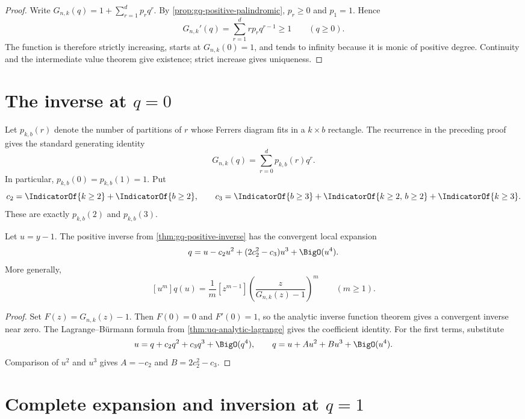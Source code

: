\begin{proof}
Write \(G_{n,k}(q)=1+\sum_{r=1}^{d}p_rq^r\).  By
\cref{prop:gq-positive-palindromic}, \(p_r\ge0\) and \(p_1=1\).  Hence
\[
  G_{n,k}'(q)=\sum_{r=1}^{d}rp_rq^{r-1}\ge1
  \qquad(q\ge0).
\]
The function is therefore strictly increasing, starts at \(G_{n,k}(0)=1\),
and tends to infinity because it is monic of positive degree.  Continuity and
the intermediate value theorem give existence; strict increase gives
uniqueness.
\end{proof}

\section{\texorpdfstring{The inverse at \(q=0\)}{The inverse at q=0}}
\label{sec:gaussian-zero}

Let \(p_{k,b}(r)\) denote the number of partitions of \(r\) whose Ferrers
diagram fits in a \(k\times b\) rectangle.  The recurrence in the preceding
proof gives the standard generating identity
\[
  G_{n,k}(q)=\sum_{r=0}^{d}p_{k,b}(r)q^r.
\]
In particular, \(p_{k,b}(0)=p_{k,b}(1)=1\).  Put
\[
  c_2=\IndicatorOf{k\ge2}+\IndicatorOf{b\ge2},
  \qquad
  c_3=\IndicatorOf{b\ge3}
      +\IndicatorOf{k\ge2,\,b\ge2}
      +\IndicatorOf{k\ge3}.
\]
These are exactly \(p_{k,b}(2)\) and \(p_{k,b}(3)\).

\begin{theorem}
\label{thm:gq-zero-inverse}
Let \(u=y-1\).  The positive inverse from
\cref{thm:gq-positive-inverse} has the convergent local expansion
\[
  q=u-c_2u^2+(2c_2^2-c_3)u^3+\BigO(u^4).
\]
More generally,
\[
  [u^m]q(u)
  =\frac1m[z^{m-1}]
    \left(\frac{z}{G_{n,k}(z)-1}\right)^m
  \qquad(m\ge1).
\]
\end{theorem}

\begin{proof}
Set \(F(z)=G_{n,k}(z)-1\).  Then \(F(0)=0\) and \(F'(0)=1\), so the
analytic inverse function theorem gives a convergent inverse near zero.
The Lagrange--Bürmann formula from
\cref{thm:uq-analytic-lagrange} gives the coefficient identity.  For the
first terms, substitute
\[
  u=q+c_2q^2+c_3q^3+\BigO(q^4),
  \qquad
  q=u+A u^2+B u^3+\BigO(u^4).
\]
Comparison of \(u^2\) and \(u^3\) gives \(A=-c_2\) and
\(B=2c_2^2-c_3\).
\end{proof}

\section{\texorpdfstring{Complete expansion and inversion at \(q=1\)}{Complete expansion and inversion at q=1}}
\label{sec:gaussian-one}

